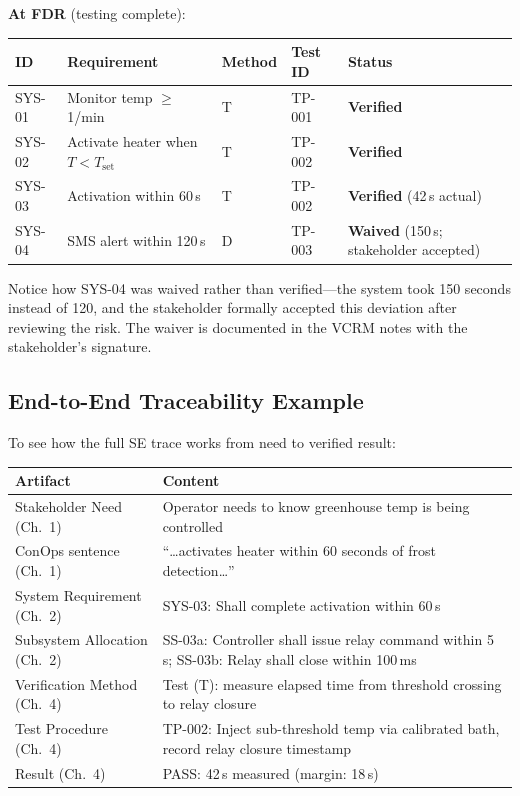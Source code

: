 \documentclass[11pt,letterpaper,twoside,openany]{book}
\begin{document}
\begin{keyconceptbox}
\textbf{At FDR} (testing complete):
\begin{center}\small
\begin{tabularx}{\textwidth}{l X l l l}
\toprule
\textbf{ID} & \textbf{Requirement} & \textbf{Method} & \textbf{Test ID} & \textbf{Status} \\
\midrule
SYS-01 & Monitor temp $\geq$1/min & T & TP-001 & \textbf{Verified} \\
SYS-02 & Activate heater when $T < T_{\text{set}}$ & T & TP-002 & \textbf{Verified} \\
SYS-03 & Activation within 60\,s & T & TP-002 & \textbf{Verified} (42\,s actual) \\
SYS-04 & SMS alert within 120\,s & D & TP-003 & \textbf{Waived} (150\,s; stakeholder accepted) \\
\bottomrule
\end{tabularx}
\end{center}
Notice how SYS-04 was waived rather than verified---the system took 150 seconds instead of 120, and the stakeholder formally accepted this deviation after reviewing the risk. The waiver is documented in the VCRM notes with the stakeholder's signature.
\end{keyconceptbox}

\subsection{End-to-End Traceability Example}
To see how the full SE trace works from need to verified result:

\begin{center}\small
\begin{tabularx}{\textwidth}{l X}
\toprule
\textbf{Artifact} & \textbf{Content} \\
\midrule
Stakeholder Need (Ch.~1) & Operator needs to know greenhouse temp is being controlled \\
ConOps sentence (Ch.~1) & ``\ldots activates heater within 60 seconds of frost detection\ldots'' \\
System Requirement (Ch.~2) & SYS-03: Shall complete activation within 60\,s \\
Subsystem Allocation (Ch.~2) & SS-03a: Controller shall issue relay command within 5\,s; SS-03b: Relay shall close within 100\,ms \\
Verification Method (Ch.~4) & Test (T): measure elapsed time from threshold crossing to relay closure \\
Test Procedure (Ch.~4) & TP-002: Inject sub-threshold temp via calibrated bath, record relay closure timestamp \\
Result (Ch.~4) & PASS: 42\,s measured (margin: 18\,s) \\
\bottomrule
\end{tabularx}
\end{center}
\end{document}
